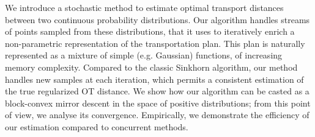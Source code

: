 We introduce a stochastic method to estimate optimal transport distances between
two continuous probability distributions. Our algorithm handles streams of
points sampled from these distributions, that it uses to iteratively enrich a
non-parametric representation of the transportation plan. This plan is naturally
represented as a mixture of simple (e.g. Gaussian) functions, of increasing
memory complexity. Compared to the classic Sinkhorn algorithm, our method
handles new samples at each iteration, which permits a consistent estimation of
the true regularized OT distance. We show how our algorithm can be casted as a
block-convex mirror descent in the space of positive distributions; from this
point of view, we analyse its convergence. Empirically, we demonstrate the
efficiency of our estimation compared to concurrent methods.